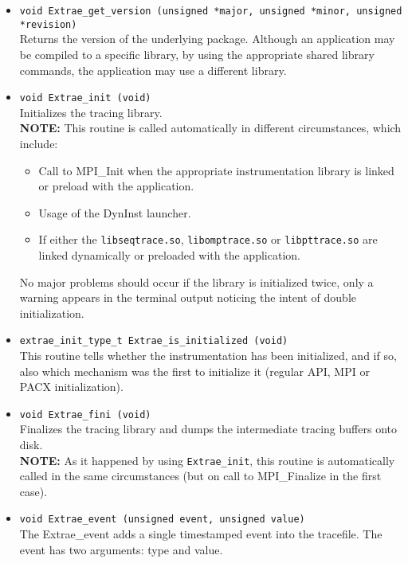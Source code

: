 \begin{itemize}

 \item {\tt void Extrae\_get\_version (unsigned *major, unsigned *minor, unsigned *revision)}\\
 Returns the version of the underlying \TRACE package. Although an application may be compiled to a specific \TRACE library, by using the appropriate shared library commands, the application may use a different \TRACE library.

 \item {\tt void Extrae\_init (void)}\\
 Initializes the tracing library.\\
 {\bf NOTE:} This routine is called automatically in different circumstances, which include:
    \begin{itemize}
      \item Call to MPI\_Init when the appropriate instrumentation library is linked or preload with the application.
      \item Usage of the DynInst launcher.
      \item If either the {\tt libseqtrace.so}, {\tt libomptrace.so} or {\tt libpttrace.so} are linked dynamically or preloaded with the application.
    \end{itemize}
  No major problems should occur if the library is initialized twice, only a warning appears in the terminal output noticing the intent of double initialization.

 \item {\tt extrae\_init\_type\_t Extrae\_is\_initialized (void)}\\
 This routine tells whether the instrumentation has been initialized, and if so, also which mechanism was the first to initialize it (regular API, MPI or PACX initialization).

 \item {\tt void Extrae\_fini (void)}\\
 Finalizes the tracing library and dumps the intermediate tracing buffers onto disk.\\
 {\bf NOTE:} As it happened by using {\tt Extrae\_init}, this routine is automatically called in the same circumstances (but on call to MPI\_Finalize in the first case).

 \item {\tt void Extrae\_event (unsigned event, unsigned value)}\\
 The Extrae\_event adds a single timestamped event into the tracefile. The event has two arguments: type and value.


\end{itemize}
